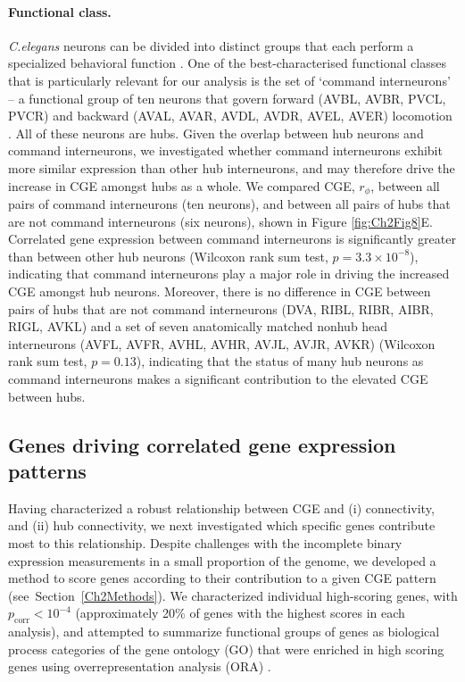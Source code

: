 {\paragraph{Functional class.}
\emph{C.elegans} neurons can be divided into distinct groups that each perform a specialized behavioral function \citep{Hobert2003}.
One of the best-characterised functional classes that is particularly relevant for our analysis is the set of `command interneurons' -- a functional group of ten neurons that govern forward (AVBL, AVBR, PVCL, PVCR) and backward (AVAL, AVAR, AVDL, AVDR, AVEL, AVER) locomotion \citep{Rakowski2013}.
All of these neurons are hubs.
Given the overlap between hub neurons and command interneurons, we investigated whether command interneurons exhibit more similar expression than other hub interneurons, and may therefore drive the increase in CGE amongst hubs as a whole.
We compared CGE, $r_\phi$, between all pairs of command interneurons (ten neurons), and between all pairs of hubs that are not command interneurons (six neurons), shown in Figure \ref{fig:Ch2Fig8}E.
Correlated gene expression between command interneurons is significantly greater than between other hub neurons (Wilcoxon rank sum test, $p = 3.3 \times 10^{-8}$), indicating that command interneurons play a major role in driving the increased CGE amongst hub neurons.
Moreover, there is no difference in CGE between pairs of hubs that are not command interneurons (DVA, RIBL, RIBR, AIBR, RIGL, AVKL) and a set of seven anatomically matched nonhub head interneurons (AVFL, AVFR, AVHL, AVHR, AVJL, AVJR, AVKR) (Wilcoxon rank sum test, $p = 0.13$), indicating that the status of many hub neurons as command interneurons makes a significant contribution to the elevated CGE between hubs.

\subsection{Genes driving correlated gene expression patterns}

Having characterized a robust relationship between CGE and (i) connectivity, and (ii) hub connectivity, we next investigated which specific genes contribute most to this relationship.
Despite challenges with the incomplete binary expression measurements in a small proportion of the genome, we developed a method to score genes according to their contribution to a given CGE pattern \mbox{(see Section \ref{Ch2Methods})}.
We characterized individual high-scoring genes, with $p_\mathrm{corr} < 10^{-4}$ (approximately 20\% of genes with the highest scores in each analysis), and attempted to summarize functional groups of genes as biological process categories of the gene ontology (GO) that were enriched in high scoring genes using overrepresentation analysis (ORA) \citep{Ashburner2000, Gillis2010}.

}
